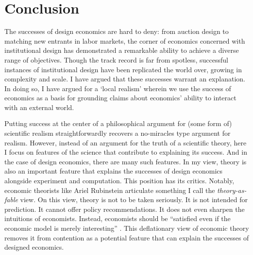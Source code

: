 


\section{Conclusion}\label{fable_sec_conc}

The successes of design economics are hard to deny: from auction design to matching new entrants in labor markets, the corner of economics concerned with institutional design has demonstrated a remarkable ability to achieve a diverse range of objectives. Though the track record is far from spotless, successful instances of institutional design have been replicated the world over, growing in complexity and scale. I have argued that these successes warrant an explanation. In doing so, I have argued for a `local realism' wherein we use the success of economics as a basis for grounding claims about economics' ability to interact with an external world.

Putting success at the center of a philosophical argument for (some form of) scientific realism straightforwardly recovers a no-miracles type argument for realism. However, instead of an argument for the truth of a scientific theory, here I focus on features of the science that contribute to explaining its success. And in the case of design economics, there are many such features. In my view, theory is also an important feature that explains the successes of design economics alongside experiment and computation. This position has its critics. Notably, economic theorists like Ariel Rubinstein \autocite*{rubinstein2006,rubinstein2012} articulate something I call the \textit{theory-as-fable} view. On this view, theory is not to be taken seriously. It is not intended for prediction. It cannot offer policy recommendations. It does not even sharpen the intuitions of economists. Instead, economists should be ``satisfied even if the economic model is merely interesting'' \autocite[36]{rubinstein1982}. This deflationary view of economic theory removes it from contention as a potential feature that can explain the successes of designed economics.

